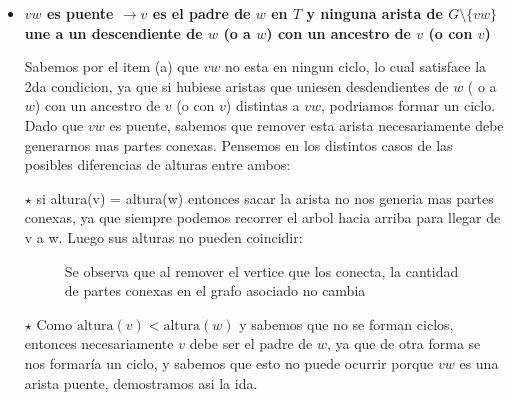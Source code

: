 \documentclass{article}
\begin{document}
\begin{itemize}

\item \textbf{$vw$ es puente $\rightarrow  v$ es el padre de $w$ en $T$ y ninguna arista de $G \setminus \{vw\}$ une a un descendiente de $w$ (o a $w$) con un ancestro de $v$ (o con $v$)}

Sabemos por el item (a) que $vw$ no esta en ningun ciclo, lo cual satisface la 2da condicion, ya que si hubiese aristas que uniesen desdendientes de $w$ ( o a $w$) con un ancestro de $v$ (o con $v$) distintas a $vw$, podriamos formar un ciclo. \\
Dado que $vw$ es puente, sabemos que remover esta arista necesariamente debe generarnos mas partes conexas. Pensemos en los distintos casos de las posibles diferencias de alturas entre ambos:

\item[$\star$] si altura(v) = altura(w) entonces sacar la arista no nos generia mas partes conexas, ya que siempre podemos recorrer el arbol hacia arriba para llegar de v a w. Luego sus alturas no pueden  coincidir:
\begin{figure}[h]
\begin{center}
\caption{Se observa que al remover el vertice que los conecta, la cantidad de partes conexas en el grafo asociado  no cambia}
\end{center}
\end{figure}

\item[$\star$]  Como $\text{altura}(v) < \text{altura}(w)$ y sabemos que no se forman ciclos, entonces necesariamente $v$ debe ser el padre de $w$, ya que de otra forma se nos formaría un ciclo, y sabemos que esto no puede ocurrir porque $vw$ es una arista puente, demostramos asi la ida.
\begin{figure}[h]
\centering
{}
\end{figure}
\end{itemize}
\end{document}

